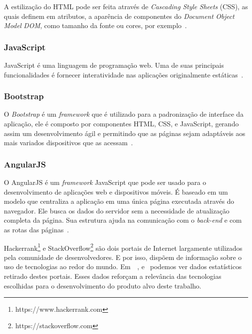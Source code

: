 A estilização do HTML pode ser feita através de \textit{Cascading Style Sheets} (CSS), as quais definem em atributos, a aparência de componentes do \textit{Document Object Model} \textit{DOM}, como tamanho da fonte ou cores, por exemplo~\cite{abreu2016desenvolvimento}.

\subsubsection{JavaScript}

JavaScript é uma linguagem de programação web.
Uma de suas principais funcionalidades é fornecer interatividade nas aplicações originalmente estáticas~\cite{de2016estudo}.

\subsubsection{Bootstrap}

O \textit{Bootstrap} é um \textit{framework} que é utilizado para a padronização de interface da aplicação, ele é composto por componentes HTML, CSS, e JavaScript, gerando assim um desenvolvimento ágil e permitindo que as páginas sejam adaptáveis aos mais variados dispositivos que as acessam~\cite{pereira2017ferramenta}. 

\subsubsection{AngularJS}

O AngularJS é um \textit{framework} JavaScript que pode ser usado para o desenvolvimento de aplicações web e dispositivos móveis.
É baseado em um modelo que centraliza a aplicação em uma única página executada através do navegador.
Ele busca os dados do servidor sem a necessidade de atualização completa da página.
Sua estrutura ajuda na comunicação com o \textit{back-end} e com as rotas das páginas~\cite{de2016estudo}.

Hackerrank\footnote{https://www.hackerrank.com} e StackOverflow\footnote{https://stackoverflow.com} são dois portais de Internet largamente utilizados pela comunidade de desenvolvedores. E por isso, dispõem de informação sobre o uso de tecnologias ao redor do mundo.
Em~~, e~ podemos ver dados estatísticos retirado destes portais.
Esses dados reforçam a relevância das tecnologias escolhidas para o desenvolvimento do produto alvo deste trabalho.


